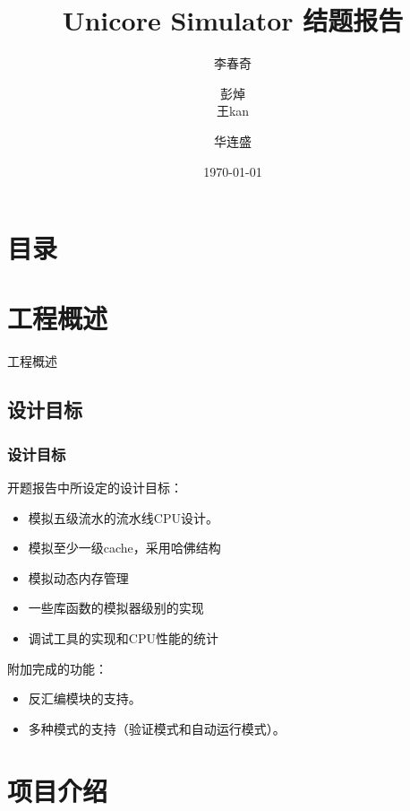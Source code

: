 \documentclass[CJK]{beamer}
\begin{document}
\begin{CJK}{UTF8}{gbsn}

\title[Simulator]{\huge Unicore Simulator 结题报告}
\author{李春奇 \and 彭焯 \\ 王kan \and 华连盛}
\date{\today}

\begin{frame}
\titlepage
\end{frame}

\section*{目录}


\section{工程概述}

\begin{frame}
\huge{工程概述}
\end{frame}

\subsection{设计目标}
\begin{frame}
	\frametitle{设计目标}
	开题报告中所设定的设计目标：
	\begin{itemize}
		\item 模拟五级流水的流水线CPU设计。
		\item 模拟至少一级cache，采用哈佛结构
		\item 模拟动态内存管理
		\item 一些库函数的模拟器级别的实现
		\item 调试工具的实现和CPU性能的统计
	\end{itemize}
	附加完成的功能：
	\begin{itemize}
		\item 反汇编模块的支持。
		\item 多种模式的支持（验证模式和自动运行模式）。
	\end{itemize}
\end{frame}

\section{项目介绍}


\end{CJK}
\end{document}
